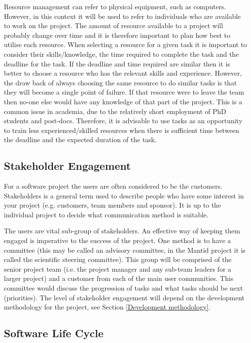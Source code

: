 \documentclass[jnr]{iosart2x}
\begin{document}
Resource management can refer to physical equipment, such as computers.
However, in this context it will be used to refer to individuals who are available to work on the project.
The amount of resource available to a project will probably change over time and it is therefore important to plan how best to utilise each resource.
When selecting a resource for a given task it is important to consider their skills/knowledge, the time required to complete the task and the deadline for the task.
If the deadline and time required are similar then it is better to choose a resource who has the relevant skills and experience.
However, the draw back of always choosing the same resource to do similar tasks is that they will become a single point of failure.
If that resource were to leave the team then no-one else would have any knowledge of that part of the project.
This is a common  issue in academia, due to the relatively short employment of PhD students and post-docs.
Therefore, it is advisable to use tasks as an opportunity to train less experienced/skilled resources when there is sufficient time between the deadline and the expected duration of the task.

\subsection{Stakeholder Engagement}
\label{se}

For a software project the users are often considered to be the customers.
Stakeholders is a general term used to describe people who have some interest in your project (e.g. customers, team members and sponsor).
It is up to the individual project to decide what communication method is suitable.

The users are vital sub-group of stakeholders.
An effective way of keeping them engaged is imperative to the success of the project.
One method is to have a committee (this may be called an advisory committee, in the Mantid project it is called the scientific steering committee).
This group will be comprised of the senior project team (i.e. the project manager and any sub-team leaders for a larger project) and a customer from each of the main user communities.
This committee would discuss the progression of tasks and what tasks should be next (priorities).
The level of stakeholder engagement will depend on the development methodology for the project, see Section \ref{Development methodology}.

\subsection{Software Life Cycle}
\label{lc}
\end{document}
